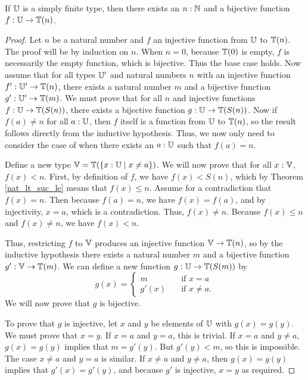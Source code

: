 \documentclass[../../math.tex]{subfiles}
\begin{document}
\begin{theorem} \label{simple_finite_bij}
    If $\mathbb{U}$ is a simply finite type, then there exists an $n : \mathbb{N}$ and a
    bijective function $f : \mathbb{U} \to \mathbb{T}(n)$.
\end{theorem}
\begin{proof}
    Let $n$ be a natural number and $f$ an injective function from $\mathbb{U}$ to
    $\mathbb{T}(n)$.  The proof will be by induction on $n$.  When $n = 0$, because
    $\mathbb{T}(0)$ is empty, $f$ is necessarily the empty function, which is bijective.
    Thus the base case holds.  Now assume that for all types $\mathbb{U}'$ and natural
    numbers $n$ with an injective function $f' : \mathbb{U}' \to \mathbb{T}(n)$, there exists a
    natural number $m$ and a bijective function $g' : \mathbb{U}' \to \mathbb{T}(m)$.  We must
    prove that for all $n$ and injective functions $f : \mathbb{U} \to \mathbb{T}(S(n))$, there
    exists a bijective function $g : \mathbb{U} \to \mathbb{T}(S(n))$.  Now if $f(a) \neq n$ for
    all $a : \mathbb{U}$, then $f$ itself is a function from $\mathbb{U}$ to $\mathbb{T}(n)$, so the
    result follows directly from the inductive hypothesis.  Thus, we now only
    need to consider the case of when there exists an $a : \mathbb{U}$ such that $f(a) =
    n$.

    Define a new type $\mathbb{V} = \mathbb{T}(\{x : \mathbb{U} \mid x \neq a\})$.  We will now prove
    that for all $x : \mathbb{V}$, $f(x) < n$.  First, by definition of $f$, we have
    $f(x) < S(n)$, which by Theorem \ref{nat_lt_suc_le} means that $f(x) \leq
    n$.  Assume for a contradiction that $f(x) = n$.  Then because $f(a) = n$,
    we have $f(x) = f(a)$, and by injectivity, $x = a$, which is a
    contradiction.  Thus, $f(x) \neq n$.  Because $f(x) \leq n$ and $f(x) \neq
    n$, we have $f(x) < n$.

    Thus, restricting $f$ to $\mathbb{V}$ produces an injective function $\mathbb{V} \to \mathbb{T}(n)$,
    so by the inductive hypothesis there exists a natural number $m$ and a
    bijective function $g' : \mathbb{V} \to \mathbb{T}(m)$.  We can define a new function $g :
    \mathbb{U} \to \mathbb{T}(S(m))$ by
    \[
        g(x) = \begin{cases}
            m \quad &\text{if $x = a$} \\
            g'(x) \quad &\text{if $x \neq a$.}
        \end{cases}
    \]
    We will now prove that $g$ is bijective.

    To prove that $g$ is injective, let $x$ and $y$ be elements of $\mathbb{U}$ with
    $g(x) = g(y)$.  We must prove that $x = y$.  If $x = a$ and $y = a$, this is
    trivial.  If $x = a$ and $y \neq a$, $g(x) = g(y)$ implies that $m = g'(y)$.
    But $g'(y) < m$, so this is impossible.  The case $x \neq a$ and $y = a$ is
    similar.  If $x \neq a$  and $y \neq a$, then $g(x) = g(y)$ implies that
    $g'(x) = g'(y)$, and because $g'$ is injective, $x = y$ as required.


\end{proof}
\end{document}
